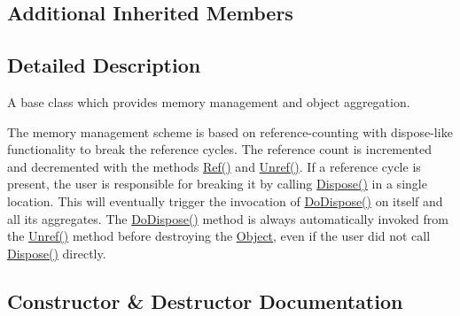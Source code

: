 \subsection*{Additional Inherited Members}


\subsection{Detailed Description}
A base class which provides memory management and object aggregation. 

The memory management scheme is based on reference-\/counting with dispose-\/like functionality to break the reference cycles. The reference count is incremented and decremented with the methods \hyperlink{classns3_1_1SimpleRefCount_ab7545a4e56ceef44cb91e2bbf0f26f18}{Ref()} and \hyperlink{classns3_1_1SimpleRefCount_aeb8f59b2f744915a64a2271c9e4b5ec0}{Unref()}. If a reference cycle is present, the user is responsible for breaking it by calling \hyperlink{classns3_1_1Object_aa90ae598863f6c251cdab3c3722afdaf}{Dispose()} in a single location. This will eventually trigger the invocation of \hyperlink{classns3_1_1Object_a475d429a75d302d4775f4ae32479b287}{Do\+Dispose()} on itself and all its aggregates. The \hyperlink{classns3_1_1Object_a475d429a75d302d4775f4ae32479b287}{Do\+Dispose()} method is always automatically invoked from the \hyperlink{classns3_1_1SimpleRefCount_aeb8f59b2f744915a64a2271c9e4b5ec0}{Unref()} method before destroying the \hyperlink{classns3_1_1Object}{Object}, even if the user did not call \hyperlink{classns3_1_1Object_aa90ae598863f6c251cdab3c3722afdaf}{Dispose()} directly. 

\subsection{Constructor \& Destructor Documentation}

